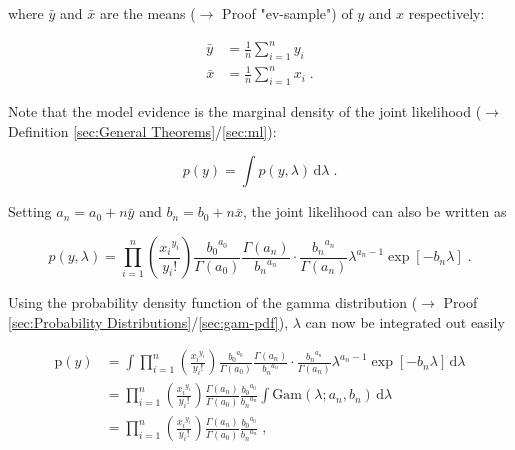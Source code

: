 \documentclass[a4paper,12pt]{book}
\begin{document}
where $\bar{y}$ and $\bar{x}$ are the means ($\rightarrow$ Proof "ev-sample") of $y$ and $x$ respectively:

\begin{equation} \label{eq:poissexp-lme-xy-mean}
\begin{split}
\bar{y} &= \frac{1}{n} \sum_{i=1}^n y_i \\
\bar{x} &= \frac{1}{n} \sum_{i=1}^n x_i \; .
\end{split}
\end{equation}

Note that the model evidence is the marginal density of the joint likelihood ($\rightarrow$ Definition \ref{sec:General Theorems}/\ref{sec:ml}):

\begin{equation} \label{eq:poissexp-lme-Poiss-exp-ME}
p(y) = \int p(y,\lambda) \, \mathrm{d}\lambda \; .
\end{equation}

Setting $a_n = a_0 + n \bar{y}$ and $b_n = b_0 + n \bar{x}$, the joint likelihood can also be written as

\begin{equation} \label{eq:poissexp-lme-Poiss-exp-JL-s3}
p(y,\lambda) = \prod_{i=1}^n \left(\frac{ {x_i}^{y_i}}{y_i !}\right) \frac{ {b_0}^{a_0}}{\Gamma(a_0)} \frac{\Gamma(a_n)}{ {b_n}^{a_n}} \cdot \frac{ {b_n}^{a_n}}{\Gamma(a_n)} \lambda^{a_n-1} \exp\left[-b_n \lambda\right] \; .
\end{equation}

Using the probability density function of the gamma distribution ($\rightarrow$ Proof \ref{sec:Probability Distributions}/\ref{sec:gam-pdf}), $\lambda$ can now be integrated out easily

\begin{equation} \label{eq:poissexp-lme-Poiss-exp-ME-qed}
\begin{split}
\mathrm{p}(y) &= \int \prod_{i=1}^n \left(\frac{ {x_i}^{y_i}}{y_i !}\right) \frac{ {b_0}^{a_0}}{\Gamma(a_0)} \frac{\Gamma(a_n)}{ {b_n}^{a_n}} \cdot \frac{ {b_n}^{a_n}}{\Gamma(a_n)} \lambda^{a_n-1} \exp\left[-b_n \lambda\right] \, \mathrm{d}\lambda \\
&= \prod_{i=1}^n \left(\frac{ {x_i}^{y_i}}{y_i !}\right) \frac{\Gamma(a_n)}{\Gamma(a_0)} \frac{ {b_0}^{a_0}}{ {b_n}^{a_n}} \int \mathrm{Gam}(\lambda; a_n, b_n) \, \mathrm{d}\lambda \\
&= \prod_{i=1}^n \left(\frac{ {x_i}^{y_i}}{y_i !}\right) \frac{\Gamma(a_n)}{\Gamma(a_0)} \frac{ {b_0}^{a_0}}{ {b_n}^{a_n}} \; ,
\end{split}
\end{equation}
\end{document}
